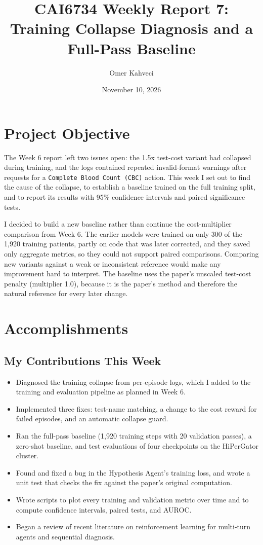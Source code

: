 \documentclass[11pt]{article}
\title{CAI6734 Weekly Report 7: Training Collapse Diagnosis and a Full-Pass Baseline}
\author{Omer Kahveci}
\date{November 10, 2026}
\begin{document}
\maketitle

\section{Project Objective}

The Week 6 report left two issues open: the 1.5x test-cost variant had
collapsed during training, and the logs contained repeated invalid-format
warnings after requests for a \texttt{Complete Blood Count (CBC)} action. This
week I set out to find the cause of the collapse, to establish a baseline
trained on the full training split, and to report its results with 95\%
confidence intervals and paired significance tests.

I decided to build a new baseline rather than continue the cost-multiplier
comparison from Week 6. The earlier models were trained on only 300 of the
1,920 training patients, partly on code that was later corrected, and they
saved only aggregate metrics, so they could not support paired comparisons.
Comparing new variants against a weak or inconsistent reference would make any
improvement hard to interpret. The baseline uses the paper's unscaled
test-cost penalty (multiplier 1.0), because it is the paper's method and
therefore the natural reference for every later change.

\section{Accomplishments}

\subsection*{My Contributions This Week}

\begin{itemize}
  \item Diagnosed the training collapse from per-episode logs, which I added to
        the training and evaluation pipeline as planned in Week 6.
  \item Implemented three fixes: test-name matching, a change to the cost
        reward for failed episodes, and an automatic collapse guard.
  \item Ran the full-pass baseline (1,920 training steps with 20 validation
        passes), a zero-shot baseline, and test evaluations of four
        checkpoints on the HiPerGator cluster.
  \item Found and fixed a bug in the Hypothesis Agent's training loss, and
        wrote a unit test that checks the fix against the paper's original
        computation.
  \item Wrote scripts to plot every training and validation metric over time
        and to compute confidence intervals, paired tests, and AUROC.
  \item Began a review of recent literature on reinforcement learning for
        multi-turn agents and sequential diagnosis.
\end{itemize}
\end{document}
